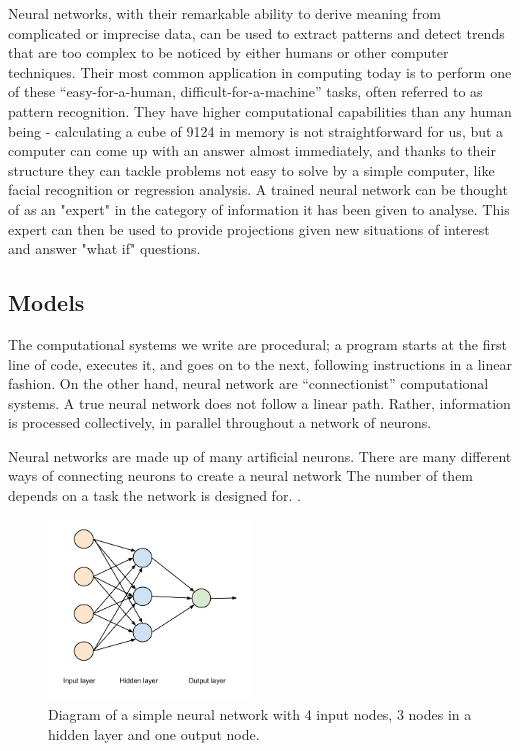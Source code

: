Neural networks, with their remarkable ability to derive meaning from complicated or imprecise data, can be used to extract patterns and detect trends that are too complex to be noticed by either humans or other computer techniques. Their most common application in computing today is to perform one of these “easy-for-a-human, difficult-for-a-machine” tasks, often referred to as pattern recognition. They have higher computational capabilities than any human being - calculating a cube of 9124 in memory is not straightforward for us, but a computer can come up with an answer almost immediately, and thanks to their structure they can tackle problems not easy to solve by a simple computer, like facial recognition or regression analysis.
A trained neural network can be thought of as an "expert" in the category of information it has been given to analyse. This expert can then be used to provide projections given new situations of interest and answer "what if" questions.

\vspace{10pt}

\subsection{Models}
The computational systems we write are procedural; a program starts at the first line of code, executes it, and goes on to the next, following instructions in a linear fashion.
On the other hand, neural network are “connectionist” computational systems. A true neural network does not follow a linear path. Rather, information is processed collectively, in parallel throughout a network of neurons.

Neural networks are made up of many artificial neurons. There are many different ways of connecting neurons to create a neural network The number of them depends on a task the network is designed for. .

\begin{figure}
  \vspace{-30pt}

  \begin{center}
    \includegraphics[width=0.48\textwidth]{Figures/simpleANN}
  \end{center}
  \caption{Diagram of a simple neural network with 4 input nodes, 3 nodes in a hidden layer and one output node.}
\end{figure}

